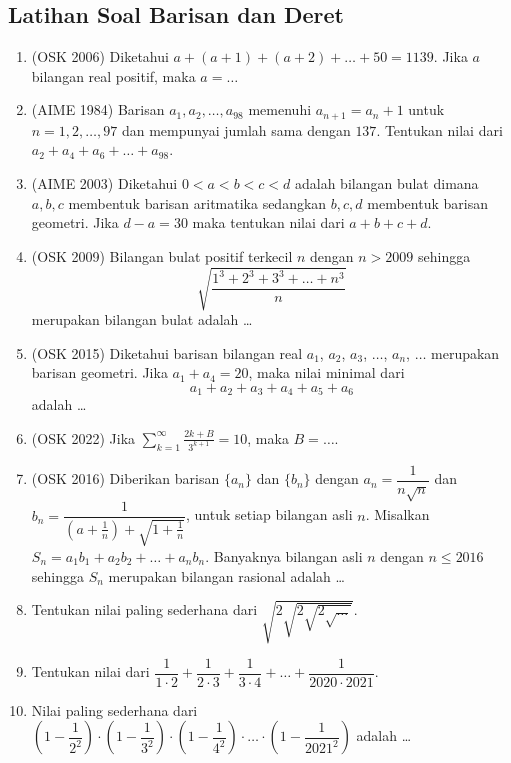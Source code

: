 \subsection{Latihan Soal Barisan dan Deret}
\begin{enumerate}
\item (OSK 2006) Diketahui $a+(a+1)+(a+2)+\dots+50=1139$. Jika $a$ bilangan real positif, maka $a=\dots$

\item (AIME 1984) Barisan $a_1,a_2,\dots,a_{98}$ memenuhi $a_{n+1}=a_n+1$ untuk $n=1,2,\dots,97$ dan mempunyai jumlah sama dengan $137$. Tentukan nilai dari $a_2+a_4+a_6+\dots+a_{98}$.

\item (AIME 2003) Diketahui $0<a<b<c<d$ adalah bilangan bulat dimana $a,b,c$ membentuk barisan aritmatika sedangkan $b,c,d$ membentuk barisan geometri. Jika $d-a=30$ maka tentukan nilai dari $a+b+c+d$.

\item (OSK 2009) Bilangan bulat positif terkecil $n$ dengan $n> 2009$ sehingga $$\sqrt{\dfrac{1^3+2^3+3^3+\dots+n^3}{n}}$$
merupakan bilangan bulat adalah \dots

\item (OSK 2015) Diketahui barisan bilangan real $a_1$, $a_2$, $a_3$, $\dots$, $a_n$, $\dots$ merupakan barisan geometri. Jika $a_1+a_4 = 20$, maka nilai minimal dari
\[a_1 + a_2 + a_3 + a_4 + a_5 + a_6\]
adalah \ldots

\item (OSK 2022) Jika $\displaystyle\sum_{k=1}^{\infty} \frac{2k + B}{3^{k+1}} = 10$, maka $B = \ldots $.

\item (OSK 2016) Diberikan barisan $\{a_n\}$ dan $\{b_n\}$ dengan $a_n = \dfrac{1}{n\sqrt{n}}$ dan $b_n = \dfrac{1}{\left(a+\frac{1}{n}\right)+\sqrt{1+\frac{1}{n}}}$, untuk setiap bilangan asli $n$. Misalkan $S_n = a_1b_1 + a_2b_2 + \ldots + a_nb_n$. Banyaknya
bilangan asli $n$ dengan $n \le 2016$ sehingga $S_n$ merupakan bilangan rasional adalah \ldots 

\item Tentukan nilai paling sederhana dari $\sqrt{2\sqrt{2\sqrt{2\sqrt{\dots}}}}$.

\item Tentukan nilai dari $\dfrac{1}{1\cdot2}+\dfrac{1}{2\cdot 3}+\dfrac{1}{3 \cdot 4}+\dots+\dfrac{1}{2020 \cdot 2021}.$

\item  Nilai paling sederhana dari $\left(1-\dfrac{1}{2^2}\right)\cdot\left(1-\dfrac{1}{3^2}\right)\cdot\left(1-\dfrac{1}{4^2}\right)\cdot\dots\cdot\left(1-\dfrac{1}{2021^2}\right)$ adalah \dots


\end{enumerate}
